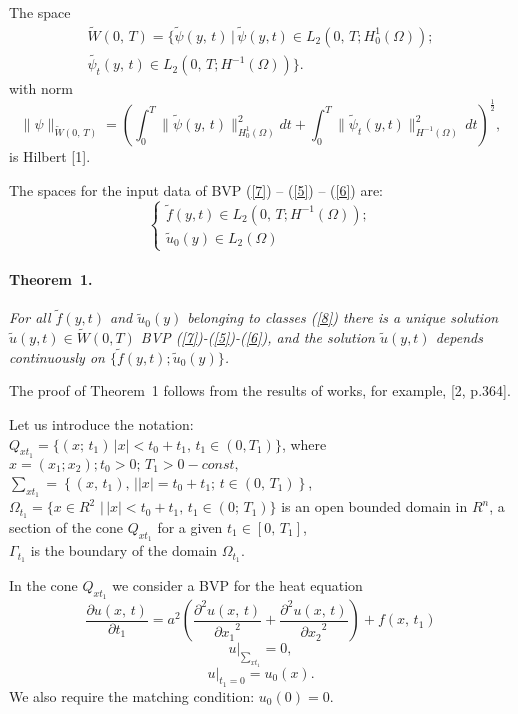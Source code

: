 The space
\begin{multline*}
\tilde {W}(0,\,T)=
\{\tilde{\psi}(y,\,t)\,\Big | \,\tilde \psi(y,t)\in L_{2}(0,\,T;H_{0}^{1}(\Omega));
\\
\tilde{\psi_{t}}(y,\,t)\in L_{2}(0,\,T;H^{-1}(\Omega))\}.
\end{multline*}
with norm
$$
\|\psi\|_{\tilde{W}(0,\,T)}=
\left(\int_{0}^{T}\|\tilde{\psi}(y,\,t)
\|_{H_{0}^{1}(\Omega)}^{2}dt
+\!\int_{0}^{T}\|\tilde{\psi}_{t}(y,t)\|_{H^{-1}(\Omega)}^{2}\,
dt\right)^{\frac{1}{2}}\!,
$$
is Hilbert [1].

The spaces for the input data of BVP (\ref{7}) -- (\ref{5}) -- (\ref{6}) are:
\begin{equation}\label{8}
\begin{cases}
\tilde{f}(y,t)\in L_{2}(0,\,T;H^{-1}(\Omega));\\
\tilde{u}_{0}(y)\in L_{2}(\Omega)
\end{cases}
\end{equation}
\paragraph{Theorem~1.}
{\it For all $\tilde{f}(y,t)$ and $\tilde{u}_{0}(y)$ belonging to classes (\ref{8}) there is a unique solution $\tilde{u}(y, t)\in\tilde{W}(0, T)$ BVP (\ref{7})-(\ref{5})-(\ref{6}), and the solution $\tilde {u} (y, t)$ depends continuously on $\{\tilde{f}(y,t); \tilde{u}_{0}(y)\}$.}

The proof of Theorem~1 follows from the results of works, for example, [2, p.364].

Let us introduce the notation:\\
$
Q_{xt_{1}}=\{(x;\,t_{1})\,|x|<t_{0}+t_{1},\, t_{1}\in(0, T_{1})\}$,
where $x=(x_{1}; x_{2}); t_{0}>0;\,T_{1}>0-const,$\\
 $\sum_{xt_1}=\left\{(x,\,t_{1}),\,| |x|=t_{0}+t_{1};\, t\in(0,\,T_{1})\right\}$,\\
$\Omega_{t_{1}}=\{x\in R^{2}\,\, | \,|x|<t_{0}+t_{1}, \,t_{1}\in(0;\,T_{1})\}$ is an open bounded domain in $R^{n}$, a section of the cone $Q_{xt_{1}}$ for a given $t_1 \in [0, \, T_1]$, \\
$\Gamma_{t_1}$ is the boundary of the domain $\Omega_{t_{1}}$.

In the cone $Q_{xt_{1}}$ we consider a BVP for the heat equation
\begin{equation}\label{1}
\frac{\partial u(x,\,t)}{\partial t_{1}}=a^2\left(\frac{{\partial}^2u(x,\,t)}{{\partial x_{1}}^2}+\frac{{\partial}^2u(x,\,t)}{{\partial x_{2}}^2}\right)+f(x,\, t_{1})
\end{equation}
\begin{equation}\label{2}
u|_{\sum_{xt_1}}=0,
\end{equation}
\begin{equation}\label{3}
u|_{t_{1}=0}=u_{0}(x).
\end{equation}
We also require the matching condition: $u_{0}(0)=0$.

